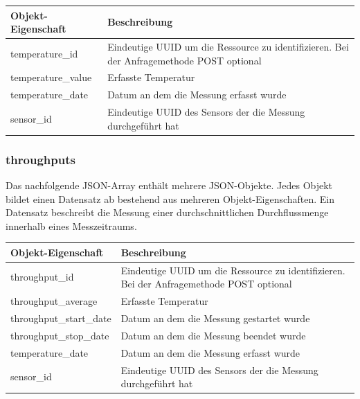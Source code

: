 \begin{table}[H]
  \begin{tabularx}{\textwidth}{lX}
    \textbf{Objekt-Eigenschaft} & \textbf{Beschreibung} \\ \toprule
    temperature\_id             & Eindeutige UUID um die Ressource zu identifizieren. Bei der Anfragemethode POST optional  \\
    temperature\_value          & Erfasste Temperatur     \\
    temperature\_date           & Datum an dem die Messung erfasst wurde   \\
    sensor\_id                  & Eindeutige UUID des Sensors der die Messung durchgeführt hat
  \end{tabularx}
\end{table}

\subsubsection{throughputs}%
\label{sec:rest.json.throughputs}
Das nachfolgende JSON-Array enthält mehrere JSON-Objekte. Jedes Objekt bildet einen Datensatz ab bestehend aus mehreren Objekt-Eigenschaften. Ein Datensatz beschreibt die Messung einer durchschnittlichen Durchflussmenge innerhalb eines Messzeitraums.

\begin{jsoncode}
\end{jsoncode}

\begin{table}[H]
  \begin{tabularx}{\textwidth}{lX}
    \textbf{Objekt-Eigenschaft} & \textbf{Beschreibung} \\ \toprule
    throughput\_id              & Eindeutige UUID um die Ressource zu identifizieren. Bei der Anfragemethode POST optional  \\
    throughput\_average         & Erfasste Temperatur     \\
    throughput\_start\_date     & Datum an dem die Messung gestartet wurde \\
    throughput\_stop\_date      & Datum an dem die Messung beendet wurde \\
    temperature\_date           & Datum an dem die Messung erfasst wurde   \\
    sensor\_id                  & Eindeutige UUID des Sensors der die Messung durchgeführt hat
  \end{tabularx}
\end{table}

